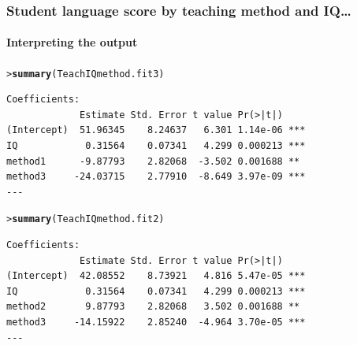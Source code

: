 \documentclass{beamer}\usepackage[]{graphicx}\usepackage[]{xcolor}
\makeatletter
\newcommand{\hlstd}[1]{\textcolor[rgb]{0.345,0.345,0.345}{#1}}%
\newcommand{\hlkwd}[1]{\textcolor[rgb]{0.737,0.353,0.396}{\textbf{#1}}}%
\newenvironment{kframe}{%
 \def\at@end@of@kframe{}%
 \ifinner\ifhmode%
  \def\at@end@of@kframe{\end{minipage}}%
  \begin{minipage}{\columnwidth}%
 \fi\fi%
 \def\FrameCommand##1{\hskip\@totalleftmargin \hskip-\fboxsep
 \colorbox{shadecolor}{##1}\hskip-\fboxsep
     \hskip-\linewidth \hskip-\@totalleftmargin \hskip\columnwidth}%
 \MakeFramed {\advance\hsize-\width
   \@totalleftmargin\z@ \linewidth\hsize
   \@setminipage}}%
 {\par\unskip\endMakeFramed%
 \at@end@of@kframe}
\newenvironment{knitrout}{}{} %
\makeatother
\begin{document}
\begin{frame}[fragile]
\frametitle{Student language score by  teaching method and IQ\ldots}
\framesubtitle{Interpreting the output}
\begin{knitrout}\scriptsize
{}\color{fgcolor}\begin{kframe}
\begin{alltt}
\hlstd{> }\hlkwd{summary}\hlstd{(TeachIQmethod.fit3)}
\end{alltt}
\end{kframe}
\end{knitrout}
\begin{knitrout}\scriptsize
{}\color{fgcolor}\begin{kframe}
\begin{verbatim}
Coefficients:
             Estimate Std. Error t value Pr(>|t|)    
(Intercept)  51.96345    8.24637   6.301 1.14e-06 ***
IQ            0.31564    0.07341   4.299 0.000213 ***
method1      -9.87793    2.82068  -3.502 0.001688 ** 
method3     -24.03715    2.77910  -8.649 3.97e-09 ***
---
\end{verbatim}
\end{kframe}
\end{knitrout}
\begin{knitrout}\scriptsize
{}\color{fgcolor}\begin{kframe}
\begin{alltt}
\hlstd{> }\hlkwd{summary}\hlstd{(TeachIQmethod.fit2)}
\end{alltt}
\end{kframe}
\end{knitrout}
\begin{knitrout}\scriptsize
{}\color{fgcolor}\begin{kframe}
\begin{verbatim}
Coefficients:
             Estimate Std. Error t value Pr(>|t|)    
(Intercept)  42.08552    8.73921   4.816 5.47e-05 ***
IQ            0.31564    0.07341   4.299 0.000213 ***
method2       9.87793    2.82068   3.502 0.001688 ** 
method3     -14.15922    2.85240  -4.964 3.70e-05 ***
---
\end{verbatim}
\end{kframe}
\end{knitrout}

\end{frame}
\end{document}
